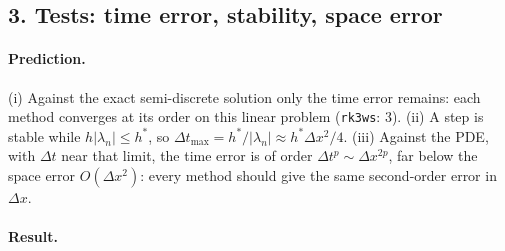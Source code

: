 \documentclass[11pt,a4paper]{article}
\begin{document}
\newpage
\subsection*{3. Tests: time error, stability, space error}

\paragraph{Prediction.} (i) Against the exact semi-discrete solution only the
time error remains: each method converges at its order on this linear
problem (\texttt{rk3ws}: 3). (ii) A step is stable while $h|\lambda_n| \le
h^*$, so $\Delta t_{\max} = h^*/|\lambda_n| \approx h^*\Delta x^2/4$.
(iii) Against the PDE, with $\Delta t$ near that limit, the time error is of
order $\Delta t^p \sim \Delta x^{2p}$, far below the space error
$O(\Delta x^2)$: every method should give the same second-order error in
$\Delta x$.

\paragraph{Result.}
\begin{center}
\small

\end{center}
\end{document}
